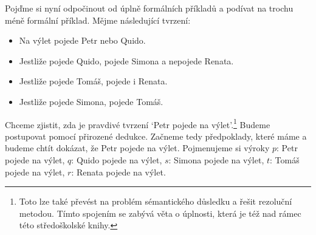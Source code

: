 \begin{example}
  Pojďme si nyní odpočinout od úplně formálních příkladů a podívat na trochu méně formální příklad. Mějme následující tvrzení:
  \begin{itemize}
    \item Na výlet pojede Petr nebo Quido.
    \item Jestliže pojede Quido, pojede Simona a nepojede Renata.
    \item Jestliže pojede Tomáš, pojede i Renata.
    \item Jestliže pojede Simona, pojede Tomáš.
  \end{itemize}
  Chceme zjistit, zda je pravdivé tvrzení `Petr pojede na výlet'.\footnote{Toto lze také převést na problém sémantického důsledku a řešit rezoluční metodou. Tímto spojením se zabývá věta o úplnosti, která je též nad rámec této středoškolské knihy.} Budeme postupovat pomocí přirozené dedukce. Začneme tedy předpoklady, které máme a budeme chtít dokázat, že Petr pojede na výlet. Pojmenujeme si výroky $p$: Petr pojede na výlet, $q$: Quido pojede na výlet, $s$: Simona pojede na výlet, $t$: Tomáš pojede na výlet, $r$: Renata pojede na výlet.


\end{example}
